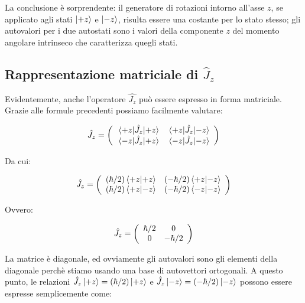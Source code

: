 La conclusione \`e sorprendente: il generatore di rotazioni intorno all'asse $z$, se applicato agli stati $\ket{+z}$ e $\ket{-z}$, risulta essere una costante per lo stato stesso; gli autovalori per i due autostati sono i valori della componente $z$ del momento angolare intrinseco che caratterizza quegli stati.

\subsection{Rappresentazione matriciale di $\hat{J}_z$}

Evidentemente, anche l'operatore $\hat{J_z}$ pu\`o essere espresso in forma matriciale. Grazie alle formule precedenti possiamo facilmente valutare:

	\begin{equation}
		\hat{J}_z = 
			\left( \begin{array}{c c}
				\mel{+z}{\hat{J}_z}{+z} & \mel{+z}{\hat{J}_z}{-z} \\
				\mel{-z}{\hat{J}_z}{+z} & \mel{-z}{\hat{J}_z}{-z} \\
			\end{array}
		\right )
	\end{equation}

Da cui:	

	\begin{equation}
		\hat{J}_z = 
			\left( \begin{array}{c c}
				(\hbar / 2) \braket{+z}{+z} & (- \hbar / 2) \braket{+z}{-z} \\
				(\hbar / 2) \braket{+z}{-z} & (- \hbar / 2) \braket{-z}{-z} 
			\end{array}
		\right )
	\end{equation}

Ovvero:
	
	\begin{equation}
		\hat{J}_z = 
			\left( \begin{array}{c c}
				\hbar / 2 & 0 \\
				0 &  - \hbar / 2 \\ 
			\end{array}
		\right )
	\end{equation}

La matrice \`e diagonale, ed ovviamente gli autovalori sono gli elementi della diagonale perch\`e stiamo usando una base di autovettori ortogonali. A questo punto, le relazioni $\hat{J}_z \ket{+z} = (\hbar / 2) \ket{+z}$ e $\hat{J}_z \ket{-z} = (- \hbar / 2) \ket{-z}$ possono essere espresse semplicemente come:

